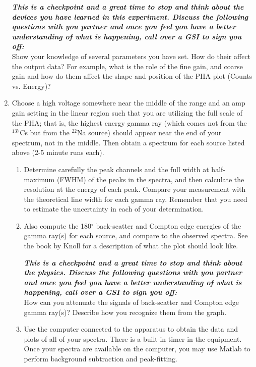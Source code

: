 \documentclass{../lab}
\begin{document}
\begin{enumerate}
    \emph{\textbf{This is a checkpoint and a great time to stop and think about the devices you have learned in this experiment. Discuss the following questions with you partner and once you feel you have a better understanding of what is happening, call over a GSI to sign you off:}}\\
    Show your knowledge of several parameters you have set. How do their affect the output data? For example, what is the role of the fine gain, and coarse gain and how do them affect the shape and position of the PHA plot (Counts vs. Energy)?

    \item Choose a high voltage somewhere near the middle of the range and an amp gain setting in the linear region such that you are utilizing the full scale of the PHA; that is, the highest energy gamma ray (which comes not from the $^{137}$Cs but from the $^{22}$Na source) should appear near the end of your spectrum, not in the middle. Then obtain a spectrum for each source listed above (2-5 minute runs each).
    \begin{enumerate}
        \item Determine carefully the peak channels and the full width at half-maximum (FWHM) of the peaks in the spectra, and then calculate the resolution at the energy of each peak. Compare your measurement with the theoretical line width for each gamma ray. Remember that you need to estimate the uncertainty in each of your determination.

        \item Also compute the 180$^\circ$ back-scatter and Compton edge energies of the gamma ray(s) for each source, and compare to the observed spectra. See the book by Knoll for a description of what the plot should look like.
        
        \emph{\textbf{This is a checkpoint and a great time to stop and think about the physics. Discuss the following questions with you partner and once you feel you have a better understanding of what is happening, call over a GSI to sign you off:}}\\
        How can you attenuate the signals of back-scatter and Compton edge gamma ray(s)? Describe how you recognize them from the graph.

        \item Use the computer connected to the apparatus to obtain the data and plots of all of your spectra. There is a built-in timer in the equipment. Once your spectra are available on the computer, you may use Matlab to perform background subtraction and peak-fitting.


\end{enumerate}
\end{enumerate}
\end{document}
